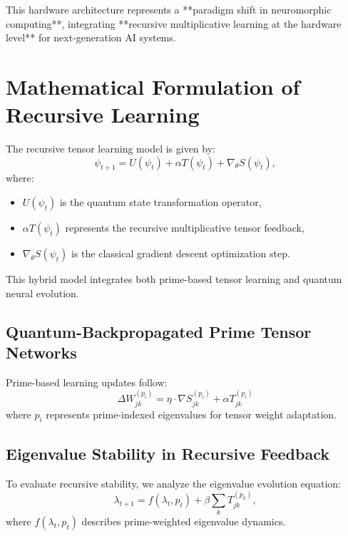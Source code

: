 \documentclass{article}
\theoremstyle{plain}
\theoremstyle{plain}
\theoremstyle{definition}
\theoremstyle{remark}
\begin{document}
This hardware architecture represents a **paradigm shift in neuromorphic computing**, integrating **recursive multiplicative learning at the hardware level** for next-generation AI systems.
\section{Mathematical Formulation of Recursive Learning}
The recursive tensor learning model is given by:
\begin{equation}
\psi_{t+1} = U(\psi_t) + \alpha T(\psi_t) + \nabla_{\theta} S(\psi_t),
\end{equation}
where:
\begin{itemize}
    \item \( U(\psi_t) \) is the quantum state transformation operator,
    \item \( \alpha T(\psi_t) \) represents the recursive multiplicative tensor feedback,
    \item \( \nabla_{\theta} S(\psi_t) \) is the classical gradient descent optimization step.
\end{itemize}
This hybrid model integrates both prime-based tensor learning and quantum neural evolution.

\subsection{Quantum-Backpropagated Prime Tensor Networks}
Prime-based learning updates follow:
\begin{equation}
\Delta W_{jk}^{(p_i)} = \eta \cdot \nabla S_{jk}^{(p_i)} + \alpha T_{jk}^{(p_i)}
\end{equation}
where \( p_i \) represents prime-indexed eigenvalues for tensor weight adaptation.

\subsection{Eigenvalue Stability in Recursive Feedback}
To evaluate recursive stability, we analyze the eigenvalue evolution equation:
\begin{equation}
\lambda_{t+1} = f(\lambda_t, p_t) + \beta \sum_{k} T_{jk}^{(p_k)},
\end{equation}
where \( f(\lambda_t, p_t) \) describes prime-weighted eigenvalue dynamics.
\end{document}
